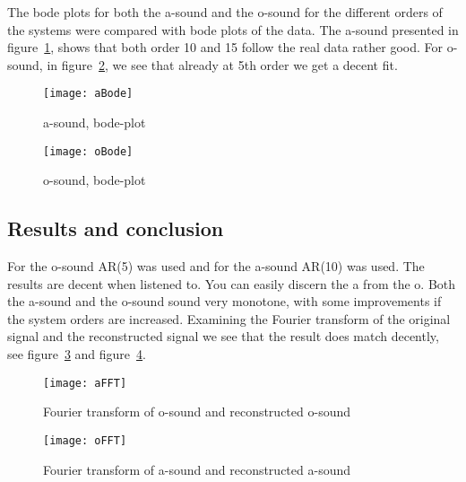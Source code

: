 \documentclass[10pt]{article}
\begin{document}
The bode plots for both the a-sound and the o-sound for the different orders of
the systems were compared with bode plots of the data. The a-sound presented in
figure~\ref{fig:aBode}, shows that both order 10 and 15 follow the real data
rather good. For o-sound, in figure~\ref{fig:oBode}, we see that already at
5th order we get a decent fit.


\begin{figure}[!hp]

    \begin{center}
      \texttt{[image: aBode]}
    \caption{a-sound, bode-plot \label{fig:aBode}}
    \end{center}

\end{figure}

\begin{figure}[!hp]

    \begin{center}
      \texttt{[image: oBode]}
    \caption{o-sound, bode-plot \label{fig:oBode}}
    \end{center}
\end{figure}

\subsection{Results and conclusion}
For the o-sound AR(5) was used and for the a-sound AR(10) was used.
The results are decent when listened to. You can easily discern the a from the o.
Both the a-sound and the o-sound sound very monotone, with some improvements if
the system orders are increased.
Examining the Fourier transform of the original signal and the reconstructed
signal we see that the result does match decently, see figure~\ref{fig:ffto} and
figure~\ref{fig:ffta}.


\begin{figure}[!hp]

    \begin{center}
      \texttt{[image: aFFT]}
    \caption{Fourier transform of o-sound and reconstructed o-sound \label{fig:ffto}}
    \end{center}

\end{figure}

\begin{figure}[!hp]

    \begin{center}
      \texttt{[image: oFFT]}
    \caption{Fourier transform of a-sound and reconstructed a-sound \label{fig:ffta}}
    \end{center}

\end{figure}
\end{document}
